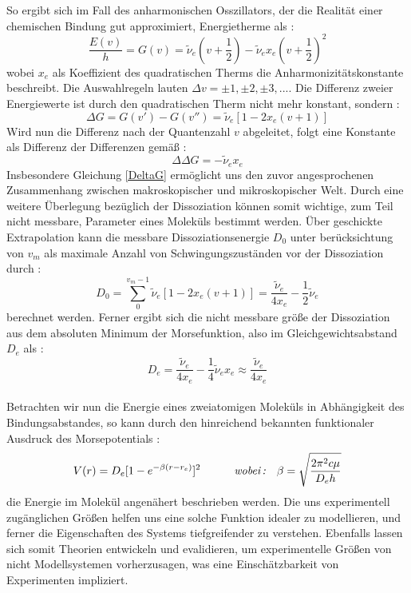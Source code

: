 So ergibt sich im Fall des anharmonischen Osszillators, der die Realität einer chemischen Bindung gut approximiert, Energietherme als :
\begin{equation}
\frac{E(v)}{h} = G(v) = \tilde{\nu}_e(v+\frac{1}{2})-\tilde{\nu}_ex_e(v+\frac{1}{2})^2
\end{equation}
wobei $x_e$ als Koeffizient des quadratischen Therms die Anharmonizitätskonstante beschreibt. Die Auswahlregeln lauten $\Delta v = \pm 1, \pm 2, \pm 3, ... $. Die Differenz zweier Energiewerte ist durch den quadratischen Therm nicht mehr konstant, sondern : 
\begin{equation}
\Delta G = G(v')-G(v'') = \tilde{\nu}_e[1-2x_e(v+1)]
\end{equation}
Wird nun die Differenz nach der Quantenzahl $v$ abgeleitet, folgt eine Konstante als Differenz der Differenzen gemäß : 
\begin{equation}
\Delta\Delta G = -\tilde{\nu}_ex_e
\label{DeltaG}
\end{equation}
Insbesondere Gleichung \ref{DeltaG} ermöglicht uns den zuvor angesprochenen Zusammenhang zwischen makroskopischer und mikroskopischer Welt. Durch eine weitere Überlegung bezüglich der Dissoziation können somit wichtige, zum Teil nicht messbare, Parameter eines Moleküls bestimmt werden. Über geschickte Extrapolation kann die messbare Dissoziationsenergie $D_0$ unter berücksichtung von $v_m$ als maximale Anzahl von Schwingungszuständen vor der Dissoziation durch : 
\begin{equation}
D_0 = \sum_{0}^{v_m-1}\tilde{\nu}_e[1-2x_e(v+1)]=\frac{\tilde{\nu}_e}{4x_e}-\frac{1}{2}\tilde{\nu}_e
\end{equation}
berechnet werden. Ferner ergibt sich die nicht messbare größe der Dissoziation aus dem absoluten Minimum der Morsefunktion, also im Gleichgewichtsabstand $D_e$ als : 
\begin{equation}
D_e = \frac{\tilde{\nu}_e}{4x_e}-\frac{1}{4}\tilde{\nu}_ex_e\approx\frac{\tilde{\nu}_e}{4x_e}
\end{equation}
\\
Betrachten wir nun die Energie eines zweiatomigen Moleküls in Abhängigkeit des Bindungsabstandes, so kann durch den hinreichend bekannten funktionaler Ausdruck des Morsepotentials : \\
\begin{equation}
V(r) = D_e[1-e^{-\beta(r-r_e)}]^2 \quad\quad\quad \textit{wobei\,:}\quad \beta = \sqrt{\frac{2\pi^2c\mu}{D_eh}}
\end{equation}
die Energie im Molekül angenähert beschrieben werden. Die uns experimentell zugänglichen Größen helfen uns eine solche Funktion idealer zu modellieren, und ferner die Eigenschaften des Systems tiefgreifender zu verstehen. Ebenfalls lassen sich somit Theorien entwickeln und evalidieren, um experimentelle Größen von nicht Modellsystemen vorherzusagen, was eine Einschätzbarkeit von Experimenten impliziert.
